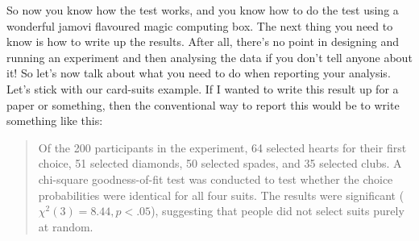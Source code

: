 
So now you know how the test works, and you know how to do the test using a wonderful jamovi flavoured magic computing box. The next thing you need to know is how to write up the results. After all, there's no point in designing and running an experiment and then analysing the data if you don't tell anyone about it! So let's now talk about what you need to do when reporting your analysis. Let's stick with our card-suits example. If I wanted to write this result up for a paper or something, then the conventional way to report this would be to write something like this:

\begin{quote}
Of the 200 participants in the experiment, 64 selected hearts for their first choice, 51 selected diamonds, 50 selected spades, and 35 selected clubs. A chi-square goodness-of-fit test was conducted to test whether the choice probabilities were identical for all four suits. The results were significant ($\chi^2(3) = 8.44, p<.05$), suggesting that people did not select suits purely at random.
\end{quote}

